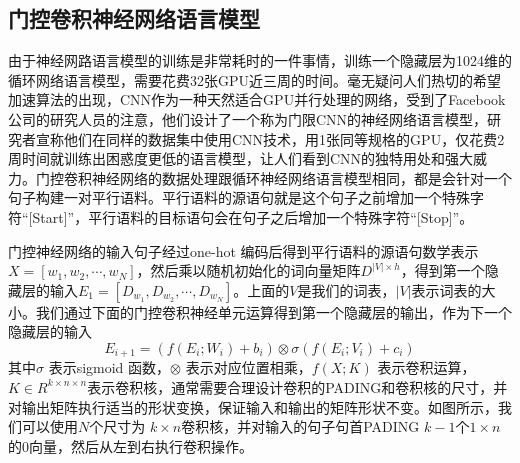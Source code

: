 \documentclass[twoside,a4paper,12pt]{book}%
\begin{document}
\subsection{门控卷积神经网络语言模型}
由于神经网路语言模型的训练是非常耗时的一件事情，训练一个隐藏层为1024维的循环网络语言模型，需要花费32张GPU近三周的时间。毫无疑问人们热切的希望加速算法的出现，\gls{CNN}作为一种天然适合GPU并行处理的网络，受到了Facebook 公司的研究人员的注意，他们设计了一个称为门限\gls{CNN}的神经网络语言模型，研究者宣称他们在同样的数据集中使用\gls{CNN}技术，用1张同等规格的GPU，仅花费2周时间就训练出困惑度更低的语言模型，让人们看到\gls{CNN}的独特用处和强大威力。门控卷积神经网络的数据处理跟循环神经网络语言模型相同，都是会针对一个句子构建一对平行语料。平行语料的源语句就是这个句子之前增加一个特殊字符“[Start]”，平行语料的目标语句会在句子之后增加一个特殊字符“[Stop]”。

门控神经网络的输入句子经过one-hot 编码后得到平行语料的源语句数学表示$X=[w_1,w_2,\cdots,w_N]$，然后乘以随机初始化的词向量矩阵$D^{|V| \times h}$，得到第一个隐藏层的输入$E_{1}=[D_{w_1},D_{w_2},\cdots,D_{w_N}]$。上面的$V$是我们的词表，$|V|$表示词表的大小。我们通过下面的门控卷积神经单元运算得到第一个隐藏层的输出，作为下一个隐藏层的输入
$$
E_{i+1} = (f(E_i; W_i) + b_i) \otimes \sigma(f(E_i; V_i) + c_i)
$$
其中$\sigma$ 表示sigmoid 函数，$\otimes$ 表示对应位置相乘，$f(X;K)$ 表示卷积运算，$K\in R^{k \times n \times n}$表示卷积核，通常需要合理设计卷积的PADING和卷积核的尺寸，并对输出矩阵执行适当的形状变换，保证输入和输出的矩阵形状不变。如图所示，我们可以使用$N$个尺寸为 $k \times n$卷积核，并对输入的句子句首PADING $k-1$个$1 \times n$的$0$向量，然后从左到右执行卷积操作。
\end{document}
